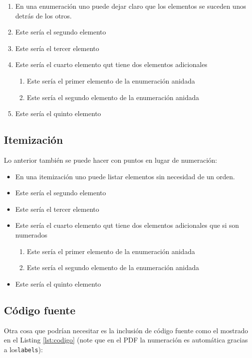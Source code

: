 \begin{enumerate}
    \item En una enumeración uno puede dejar claro que los elementos se suceden unos detrás de los otros.
    \item Este sería el segundo elemento
    \item Este sería el tercer elemento
    \item Este sería el cuarto elemento qut tiene dos elementos adicionales
    \begin{enumerate}
        \item Este sería el primer elemento de la enumeración anidada
        \item Este sería el segundo elemento de la enumeración anidada
    \end{enumerate}
    \item Este sería el quinto elemento
\end{enumerate}

\subsection{Itemización}
Lo anterior también se puede hacer con puntos en lugar de numeración:

\begin{itemize}
    \item En una itemización uno puede listar elementos sin necesidad de un orden.
    \item Este sería el segundo elemento
    \item Este sería el tercer elemento
    \item Este sería el cuarto elemento qut tiene dos elementos adicionales que si son numerados
    \begin{enumerate}
        \item Este sería el primer elemento de la enumeración anidada
        \item Este sería el segundo elemento de la enumeración anidada
    \end{enumerate}
    \item Este sería el quinto elemento
\end{itemize}

\subsection{Código fuente}
Otra cosa que podrían necesitar es la inclusión de código fuente como el mostrado en el Listing \ref{lst:codigo} (note que en el PDF la numeración es automática gracias a los\texttt{labels}):

